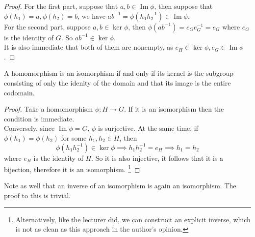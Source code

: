 \begin{proof}
    For the first part, suppose that $a,b\in\operatorname{Im}\phi$, then suppose that $\phi(h_1)=a,\phi(h_2)=b$, we have $ab^{-1}=\phi(h_1h_2^{-1})\in\operatorname{Im}\phi$.\\
    For the second part, suppose $a,b\in\ker\phi$, then $\phi(ab^{-1})=e_Ge_G^{-1}=e_G$ where $e_G$ is the identity of $G$.
    So $ab^{-1}\in\ker\phi$.\\
    It is also immediate that both of them are nonempty, as $e_H\in\ker\phi,e_G\in\operatorname{Im}\phi$.
\end{proof}
\begin{proposition}
    A homomorphism is an isomorphism if and only if its kernel is the subgroup consisting of only the idenity of the domain and that its image is the entire codomain.
\end{proposition}
\begin{proof}
    Take a homomorphism $\phi: H\to G$.
    If it is an isomorphism then the condition is immediate.\\
    Conversely, since $\operatorname{Im}\phi=G$, $\phi$ is surjective.
    At the same time, if $\phi(h_1)=\phi(h_2)$ for some $h_1,h_2\in H$, then
    $$\phi(h_1h_2^{-1})\in\ker\phi\implies h_1h_2^{-1}=e_H\implies h_1=h_2$$
    where $e_H$ is the identity of $H$.
    So it is also injective, it follows that it is a bijection, therefore it is an isomorphism.
    \footnote{Alternatively, like the lecturer did, we can construct an explicit inverse, which is not as clean as this approach in the author's opinion.}
\end{proof}
Note as well that an inverse of an isomorphism is again an isomorphism.
The proof to this is trivial.